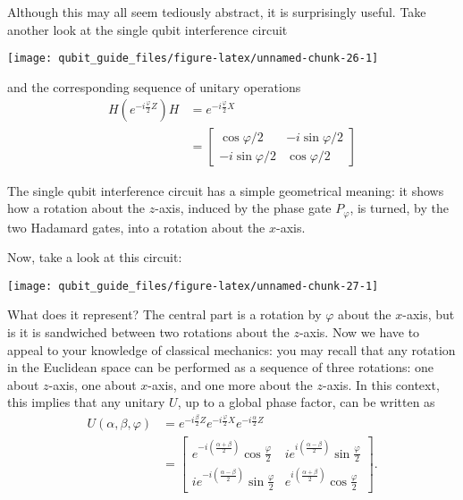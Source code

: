 \documentclass[fleqn]{article}
\newenvironment{idea}{\noindent}{\medskip}
\begin{document}
Although this may all seem tediously abstract, it is surprisingly useful.
Take another look at the single qubit interference circuit

\begin{center}\texttt{[image: qubit\_guide\_files/figure-latex/unnamed-chunk-26-1]} \end{center}

and the corresponding sequence of unitary operations
\[
  \begin{aligned}
    H \left(
      e^{-i\frac{\varphi}{2}Z}
    \right) H
    &= e^{-i\frac{\varphi}{2}X}
  \\&= \begin{bmatrix}
      \cos\varphi/2 & -i\sin\varphi/2
    \\-i\sin\varphi/2 & \cos\varphi/2
    \end{bmatrix}
  \end{aligned}
\]

\begin{idea}
The single qubit interference circuit has a simple geometrical meaning: it shows how a rotation about the \(z\)-axis, induced by the phase gate \(P_\varphi\), is turned, by the two Hadamard gates, into a rotation about the \(x\)-axis.

\end{idea}

Now, take a look at this circuit:

\begin{center}\texttt{[image: qubit\_guide\_files/figure-latex/unnamed-chunk-27-1]} \end{center}

What does it represent?
The central part is a rotation by \(\varphi\) about the \(x\)-axis, but is it is sandwiched between two rotations about the \(z\)-axis.
Now we have to appeal to your knowledge of classical mechanics: you may recall that any rotation in the Euclidean space can be performed as a sequence of three rotations: one about \(z\)-axis, one about \(x\)-axis, and one more about the \(z\)-axis.
In this context, this implies that any unitary \(U\), up to a global phase factor, can be written as
\[
  \begin{aligned}
    U(\alpha, \beta, \varphi)
    &= e^{-i\frac{\beta}{2}Z} e^{-i\frac{\varphi}{2}X} e^{-i\frac{\alpha}{2}Z}
  \\&= \begin{bmatrix}
      e^{-i\left(\frac{\alpha+\beta}{2}\right)}\cos\frac{\varphi}{2}
      & ie^{i\left(\frac{\alpha-\beta}{2}\right)}\sin\frac\varphi{2}
    \\ie^{-i\left(\frac{\alpha-\beta}{2}\right)}\sin\frac\varphi{2}
      & e^{i\left(\frac{\alpha+\beta}{2}\right)}\cos\frac\varphi{2}
    \end{bmatrix}.
  \end{aligned}
\]
\end{document}
